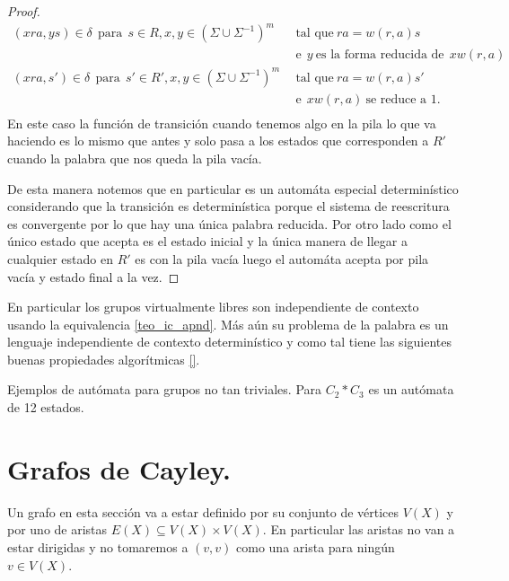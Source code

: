 \documentclass[tesis.tex]{subfiles}
\newcommand{\ic}{independiente de contexto }
\begin{document}
\begin{proof}
	\begin{align*}
	(xra,ys) \in \delta \ \ \text{para} \ \  s \in R, x,y \in (\Sigma \cup \Sigma^{-1})^m & \ \  \text{tal que} \ ra=w(r,a)s  \\ & \ \ \text{e} \ \ y \ \text{es la forma reducida de} \ \ xw(r,a)  \\
	(xra,s') \in \delta\ \ \text{para} \ \  s' \in R', x,y \in (\Sigma \cup \Sigma^{-1})^m & \ \  \text{tal que} \ ra=w(r,a)s'  \\ & \ \ \text{e}  \ \ xw(r,a)  \ \text{se reduce a 1}. \ \  \\ 
	\end{align*}
	En este caso la función de transición cuando tenemos algo en la pila lo que va haciendo es lo mismo que antes y solo pasa a los estados que corresponden a $R'$ cuando la palabra que nos queda la pila vacía. 
	
	De esta manera notemos que en particular es un automáta especial determinístico considerando que la transición es determinística porque el sistema de reescritura es convergente por lo que hay una única palabra reducida. 
	Por otro lado como el único estado que acepta es el estado inicial y la única manera de llegar a cualquier estado en $R'$ es con la pila vacía luego el automáta acepta por pila vacía y estado final a la vez.
\end{proof}

\begin{obs}
	En particular los grupos virtualmente libres son \ic usando la equivalencia \ref{teo_ic_apnd}. 
	Más aún su problema de la palabra es un lenguaje independiente de contexto determinístico y como tal tiene las siguientes buenas propiedades algorítmicas \ref{}.
\end{obs}

\begin{ej}
	Ejemplos de autómata para grupos no tan triviales.
	Para $C_2 \ast C_3$ es un autómata de 12 estados.
\end{ej}

\section{Grafos de Cayley.} \label{seccion_treewidth}

Un grafo en esta sección va a estar definido por su conjunto de vértices $V(X)$ y por uno de aristas $E(X) \subseteq V(X) \times V(X)$.
En particular las aristas no van a estar dirigidas y no tomaremos a $(v,v)$ como una arista para ningún $v \in V(X)$.
\end{document}
